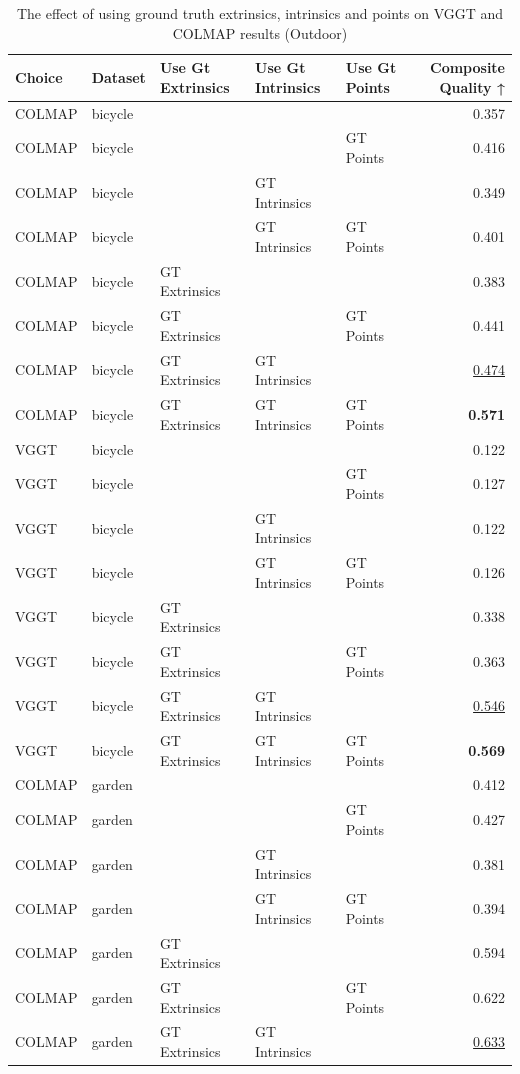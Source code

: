 \begin{table}[H]
\caption{\ifdefined\customcaption \customcaption \else The effect of using ground truth extrinsics, intrinsics and points on VGGT and COLMAP results (Outdoor) \fi}
\label{tab:06_gt_cams_outdoor}
\centering
\scriptsize
\begin{tabular}{lllllr}
\toprule
Choice & Dataset & Use Gt Extrinsics & Use Gt Intrinsics & Use Gt Points & Composite Quality ↑ \\
\midrule
COLMAP & bicycle &  &  &  & 0.357 \\
COLMAP & bicycle &  &  & GT Points & 0.416 \\
COLMAP & bicycle &  & GT Intrinsics &  & 0.349 \\
COLMAP & bicycle &  & GT Intrinsics & GT Points & 0.401 \\
COLMAP & bicycle & GT Extrinsics &  &  & 0.383 \\
COLMAP & bicycle & GT Extrinsics &  & GT Points & 0.441 \\
COLMAP & bicycle & GT Extrinsics & GT Intrinsics &  & \underline{0.474} \\
COLMAP & bicycle & GT Extrinsics & GT Intrinsics & GT Points & \textbf{0.571} \\
\midrule
VGGT & bicycle &  &  &  & 0.122 \\
VGGT & bicycle &  &  & GT Points & 0.127 \\
VGGT & bicycle &  & GT Intrinsics &  & 0.122 \\
VGGT & bicycle &  & GT Intrinsics & GT Points & 0.126 \\
VGGT & bicycle & GT Extrinsics &  &  & 0.338 \\
VGGT & bicycle & GT Extrinsics &  & GT Points & 0.363 \\
VGGT & bicycle & GT Extrinsics & GT Intrinsics &  & \underline{0.546} \\
VGGT & bicycle & GT Extrinsics & GT Intrinsics & GT Points & \textbf{0.569} \\
\midrule
COLMAP & garden &  &  &  & 0.412 \\
COLMAP & garden &  &  & GT Points & 0.427 \\
COLMAP & garden &  & GT Intrinsics &  & 0.381 \\
COLMAP & garden &  & GT Intrinsics & GT Points & 0.394 \\
COLMAP & garden & GT Extrinsics &  &  & 0.594 \\
COLMAP & garden & GT Extrinsics &  & GT Points & 0.622 \\
COLMAP & garden & GT Extrinsics & GT Intrinsics &  & \underline{0.633} \\

\end{tabular}
\end{table}
